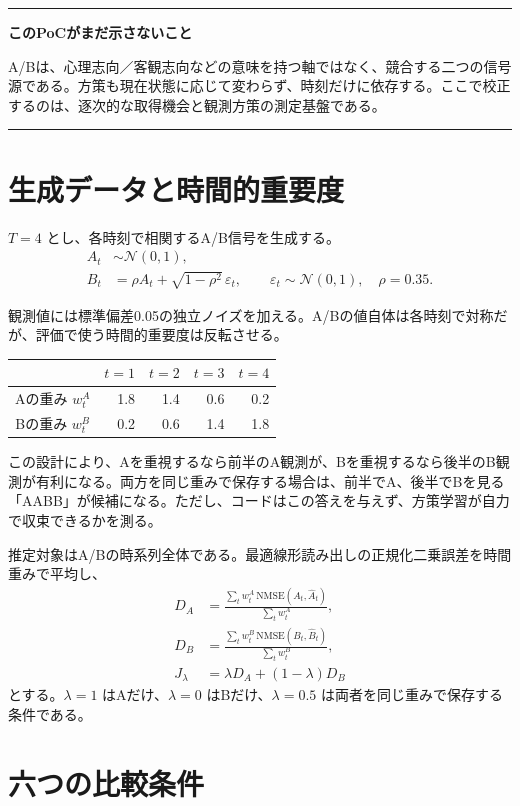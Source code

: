 \documentclass[11pt,a4paper]{ltjsarticle}
\newenvironment{warningbox}{\begin{center}\begin{minipage}{0.92\linewidth}\color{Accent}\hrule\vspace{6pt}\color{black}}{\vspace{6pt}\color{Accent}\hrule\color{black}\end{minipage}\end{center}}
\begin{document}
\begin{warningbox}
\textbf{このPoCがまだ示さないこと}

A/Bは、心理志向／客観志向などの意味を持つ軸ではなく、競合する二つの信号源である。方策も現在状態に応じて変わらず、時刻だけに依存する。ここで校正するのは、逐次的な取得機会と観測方策の測定基盤である。
\end{warningbox}

\section{生成データと時間的重要度}

$T=4$ とし、各時刻で相関するA/B信号を生成する。
\begin{align}
A_t&\sim\mathcal N(0,1),\\
B_t&=\rho A_t+\sqrt{1-\rho^2}\,\varepsilon_t,
\qquad \varepsilon_t\sim\mathcal N(0,1),\quad \rho=0.35.
\end{align}

観測値には標準偏差0.05の独立ノイズを加える。A/Bの値自体は各時刻で対称だが、評価で使う時間的重要度は反転させる。

\begin{center}
\begin{tabular}{c|rrrr}
\toprule
& $t=1$ & $t=2$ & $t=3$ & $t=4$ \\
\midrule
Aの重み $w_t^A$ & 1.8 & 1.4 & 0.6 & 0.2 \\
Bの重み $w_t^B$ & 0.2 & 0.6 & 1.4 & 1.8 \\
\bottomrule
\end{tabular}
\end{center}

この設計により、Aを重視するなら前半のA観測が、Bを重視するなら後半のB観測が有利になる。両方を同じ重みで保存する場合は、前半でA、後半でBを見る 「AABB」が候補になる。ただし、コードはこの答えを与えず、方策学習が自力で収束できるかを測る。

推定対象はA/Bの時系列全体である。最適線形読み出しの正規化二乗誤差を時間重みで平均し、
\begin{align}
D_A&=\frac{\sum_t w_t^A\,\mathrm{NMSE}(A_t,\hat A_t)}{\sum_t w_t^A},\\
D_B&=\frac{\sum_t w_t^B\,\mathrm{NMSE}(B_t,\hat B_t)}{\sum_t w_t^B},\\
J_\lambda&=\lambda D_A+(1-\lambda)D_B
\end{align}
とする。$\lambda=1$ はAだけ、$\lambda=0$ はBだけ、$\lambda=0.5$ は両者を同じ重みで保存する条件である。

\section{六つの比較条件}
\end{document}
